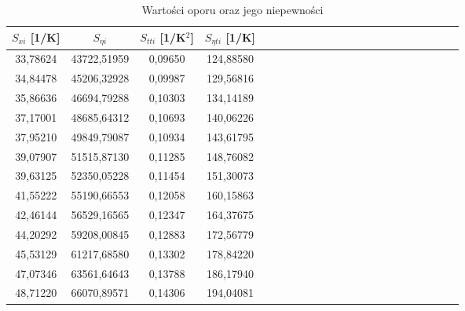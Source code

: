 \documentclass[10pt,a4paper]{article}
\begin{document}
\begin{center}
 
 \begin{center}
 \begin{table}[h!]
 \centering
 \caption{Wartości oporu oraz jego niepewności}
 \label{t5}
 \begin{tabular}{|c|c|c|c|c|c|c|c|c|c|c|c|c|c|c|c|c|c|c|c|c|c|}
 \hline
$S_{xi}$ [1/K]& $S_{\eta i}$ & $S_{tti}$ [1/K$^2$]&$S_{\eta ti}$ [1/K] \\ \hline
33,78624                    & 43722,51959                   & 0,09650         & 124,88580                   \\ \hline
34,84478                    & 45206,32928                   & 0,09987                           & 129,56816                   \\ \hline
35,86636                    & 46694,79288                   & 0,10303        & 134,14189                   \\ \hline
37,17001                    & 48685,64312                   & 0,10693      & 140,06226                   \\ \hline
37,95210                    & 49849,79087                   & 0,10934              & 143,61795                   \\ \hline
39,07907                    & 51515,87130                   & 0,11285              & 148,76082                   \\ \hline
39,63125                    & 52350,05228                   & 0,11454                & 151,30073                   \\ \hline
41,55222                    & 55190,66553                   & 0,12058              & 160,15863                   \\ \hline
42,46144                    & 56529,16565                   & 0,12347                    & 164,37675                   \\ \hline
44,20292                    & 59208,00845                   & 0,12883                      & 172,56779                   \\ \hline
45,53129                    & 61217,68580                   & 0,13302                         & 178,84220                   \\ \hline
47,07346                    & 63561,64643                   & 0,13788                                      & 186,17940                   \\ \hline
48,71220                    & 66070,89571                   & 0,14306                                      & 194,04081                   \\ \hline

\end{tabular}
\end{table}
\end{center}
\end{center}
\end{document}
